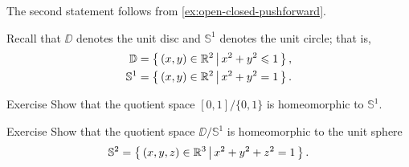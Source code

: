 The second statement follows from \ref{ex:open-closed-pushforward}.
\qeds

Recall that $\DD$ denotes the unit disc and $\mathbb{S}^1$ denotes the unit circle;
that is,
\begin{align*}
\mathbb{D}&=\left\{\,{(x,y)\in\mathbb{R}^2}\,\middle|\,{x^2+y^2\leqslant 1}\,\right\},
\\
\mathbb{S}^1&=\left\{\,{(x,y)\in\mathbb{R}^2}\,\middle|\,{x^2+y^2=1}\,\right\}.
\end{align*}

\begin{thm}{Exercise}
Show that the quotient space $[0,1]/\{0,1\}$ is homeomorphic to $\mathbb{S}^1$.
\end{thm}

\begin{thm}{Exercise}
Show that the quotient space  $\DD/\mathbb{S}^1$ is homeomorphic to the unit sphere 
\[\mathbb{S}^2=\left\{\,{(x,y,z)\in\mathbb{R}^3}\,\middle|\,{x^2+y^2+z^2=1}\,\right\}.\]
\end{thm}


